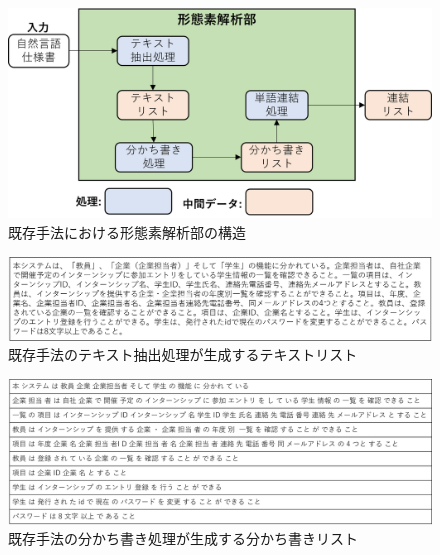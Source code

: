 \begin{figure}[tp]
    \begin{center}
        \includegraphics[width=1.0\columnwidth]{image/exis_mor_structure.png}
        \caption{既存手法における形態素解析部の構造}
        \label{fig:exis_mor_structure}
    \end{center}
\end{figure}

\begin{figure}[tp]
    \begin{center}
        \includegraphics[width=1.0\columnwidth]{image/exis_text_list.png}
        \caption{既存手法のテキスト抽出処理が生成するテキストリスト}
        \label{fig:exis_text_list}
    \end{center}
\end{figure}

\begin{figure}[tp]
    \begin{center}
        \includegraphics[width=1.0\columnwidth]{image/exis_wakati_list.png}
        \caption{既存手法の分かち書き処理が生成する分かち書きリスト}
        \label{fig:exis_wakati_list}
    \end{center}
\end{figure}

